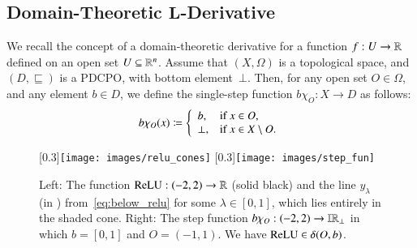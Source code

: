 \documentclass[11pt,times]{article}
\begin{document}
\subsection{Domain-Theoretic \texorpdfstring{$\boldsymbol{L}$}{L}-Derivative}




We recall the concept of a domain-theoretic derivative for a function
$f: U \to \R$ defined on an open set $U \subseteq \R^n$. Assume that
$(X, \Omega)$ is a topological space, and $(D, \sqsubseteq)$ is a
\ac{PDCPO}, with bottom element~$\bot$. Then, for any open set
$O \in \Omega$, and any element $b \in D$, we define the single-step
function $b \chi_O: X \to D$ as follows:
%
\begin{equation}
  \label{eq:single_step_fun}
  b \chi_O (x) \defeq
  \left\{
    \begin{array}{ll}
      b, &  \text{if } x \in O,\\
      \bot, & \text{if } x \in X \setminus O.
    \end{array}
  \right.
\end{equation}  

\begin{figure}[t]
  \centering
  \scalebox{0.3}[0.3]{\texttt{[image: images/relu\_cones]}} \hspace{3em}
  \scalebox{0.3}[0.3]{\texttt{[image: images/step\_fun]}}
  
  \caption{Left: The function $\ReLU: (-2,2) \to \R$ (solid black) and
    the line $y_\lambda$ (in {\color{blue}{blue}})
    from~\eqref{eq:below_relu} for some $\lambda \in [0,1]$, which
    lies entirely in the shaded cone. Right: The step function
    $b \chi_O: (-2,2) \to \intvaldom[\R\lift]$ in which $b = [0,1]$
    and $O = (-1,1)$. We have $\ReLU \in \delta(O,b)$.}
  \label{fig:relu_cones-step_fun}
\end{figure}
\end{document}
